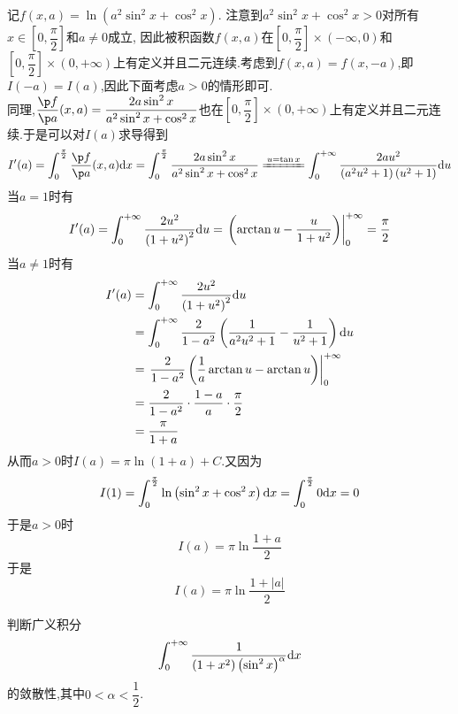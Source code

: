 \documentclass{ctexart}
\begin{document}
\begin{solution}
    记$f(x,a)=\ln\left(a^2\sin^2x+\cos^2x\right)$.%
    注意到$a^2\sin^2x+\cos^2x>0$对所有$x\in\left[0,\dfrac\pi2\right]$和$a\neq0$成立,%
    因此被积函数$f(x,a)$在$\left[0,\dfrac\pi2\right]\times(-\infty,0)$和$\left[0,\dfrac\pi2\right]\times(0,+\infty)$上有定义并且二元连续.考虑到$f(x,a)=f(x,-a)$,即$I(-a)=I(a)$,因此下面考虑$a>0$的情形即可.\\
    同理,$\dfrac{\p f}{\p a}(x,a)=\dfrac{2a\sin^2x}{a^2\sin^2x+\cos^2x}$也在$\left[0,\dfrac\pi2\right]\times(0,+\infty)$上有定义并且二元连续.于是可以对$I(a)$求导得到
    \[I'(a)
    =\int_0^{\frac\pi2}\dfrac{\p f}{\p a}(x,a)\di x
    =\int_0^{\frac\pi2}\dfrac{2a\sin^2x}{a^2\sin^2x+\cos^2x}
    \xlongequal{u=\tan x}\int_0^{+\infty}\dfrac{2au^2}{\left(a^2u^2+1\right)\left(u^2+1\right)}\di u\]
    当$a=1$时有
    \[I'(a)=\int_0^{+\infty}\dfrac{2u^2}{\left(1+u^2\right)^2}\mathrm{d} u=\left.\left(\arctan u-\dfrac{u}{1+u^2}\right)\right|_0^{+\infty}=\dfrac\pi2\]
    当$a\neq1$时有
    \[\begin{aligned}
        I'(a)
        &= \int_0^{+\infty}\dfrac{2u^2}{\left(1+u^2\right)^2}\mathrm{d} u \\
        &= \int_0^{+\infty}\dfrac{2}{1-a^2}\left(\dfrac{1}{a^2u^2+1}-\dfrac{1}{u^2+1}\right)\mathrm{d} u \\
        &= \left.\dfrac{2}{1-a^2}\left(\dfrac1a\arctan u-\arctan u\right)\right|_0^{+\infty} \\
        &= \dfrac{2}{1-a^2}\cdot\dfrac{1-a}{a}\cdot\dfrac\pi2 \\
        &= \dfrac{\pi}{1+a}
    \end{aligned}\]
    从而$a>0$时$I(a)=\pi\ln(1+a)+C$.又因为
    \[I(1)=\int_0^{\frac\pi2}\ln\left(\sin^2x+\cos^2x\right)\mathrm{d} x=\int_0^{\frac\pi2}0\mathrm{d} x=0\]
    于是$a>0$时
    \[I(a)=\pi\ln\dfrac{1+a}{2}\]
    于是
    \[I(a)=\pi\ln\dfrac{1+|a|}{2}\]

\end{solution}
\begin{problem}[5.(12\songti{分})]
    判断广义积分
    \[\int_0^{+\infty}\dfrac{1}{\left(1+x^2\right)\left(\sin^2 x\right)^\alpha}\mathrm{d} x\]
    的敛散性,其中$0<\alpha<\dfrac12$.
\end{problem}
\end{document}
